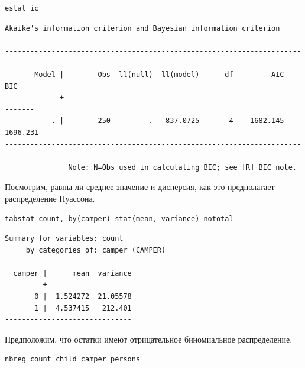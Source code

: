 \documentclass[]{book}
\begin{document}
\begin{verbatim}
estat ic
\end{verbatim}

\begin{verbatim}
Akaike's information criterion and Bayesian information criterion

-----------------------------------------------------------------------------
       Model |        Obs  ll(null)  ll(model)      df         AIC        BIC
-------------+---------------------------------------------------------------
           . |        250         .  -837.0725       4    1682.145   1696.231
-----------------------------------------------------------------------------
               Note: N=Obs used in calculating BIC; see [R] BIC note.
\end{verbatim}

Посмотрим, равны ли среднее значение и дисперсия, как это предполагает распределение Пуассона.

\begin{verbatim}
tabstat count, by(camper) stat(mean, variance) nototal
\end{verbatim}

\begin{verbatim}
Summary for variables: count
     by categories of: camper (CAMPER)

  camper |      mean  variance
---------+--------------------
       0 |  1.524272  21.05578
       1 |  4.537415   212.401
------------------------------
\end{verbatim}

Предположим, что остатки имеют отрицательное биномиальное распределение.

\begin{verbatim}
nbreg count child camper persons
\end{verbatim}
\end{document}
